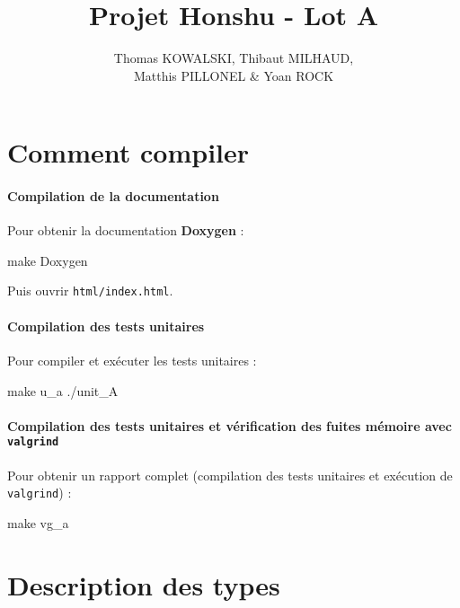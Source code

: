 \documentclass[12pt,a4paper]{article}
\title{Projet Honshu - Lot A}
\author{Thomas KOWALSKI, Thibaut MILHAUD, \\Matthis PILLONEL \& Yoan ROCK}
\begin{document}
\maketitle
\pagebreak
\tableofcontents 

\section{Comment compiler}

\paragraph{Compilation de la documentation\\}

Pour obtenir la documentation \textbf{Doxygen} :

\begin{verbatimtab}[4]
	make Doxygen
\end{verbatimtab} 

Puis ouvrir \texttt{html/index.html}.

\paragraph{Compilation des tests unitaires\\}

Pour compiler et exécuter les tests unitaires :

\begin{verbatimtab}[4]
	make u_a
	./unit_A
\end{verbatimtab} 

\paragraph{Compilation des tests unitaires et vérification des fuites mémoire avec \texttt{valgrind}\\}

Pour obtenir un rapport complet (compilation des tests unitaires et exécution de \texttt{valgrind}) :

\begin{verbatimtab}[4]
	make vg_a
\end{verbatimtab} 

\pagebreak

\section{Description des types}
\end{document}

